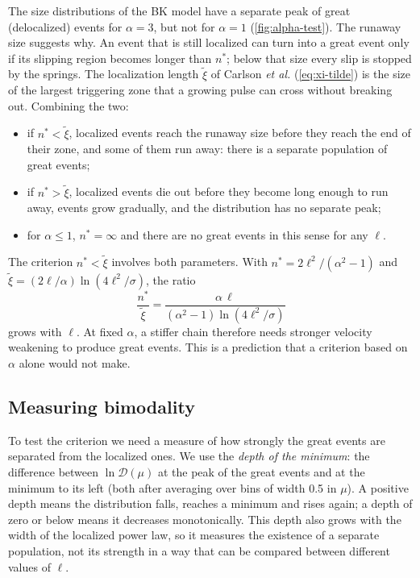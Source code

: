 The size distributions of the BK model have a separate peak of great (delocalized) events for $\alpha = 3$, but not for $\alpha = 1$
(\cref{fig:alpha-test}). The runaway size suggests why. An event that is still localized can turn into a great event only if its slipping region becomes longer than
$n^*$; below that size every slip is stopped by the springs. The localization length $\tilde\xi$ of Carlson \emph{et al.} (\cref{eq:xi-tilde}) is the size of the largest
triggering zone that a growing pulse can cross without breaking out. Combining the two:
\begin{itemize}
  \item if $n^*<\tilde\xi$, localized events reach the runaway size before they reach the end of their zone, and some of them run away: there is a separate population of
    great events;
  \item if $n^*>\tilde\xi$, localized events die out before they become long enough to run away, events grow gradually, and the distribution has no separate peak;
  \item for $\alpha\le1$, $n^* = \infty$ and there are no great events in this sense for any $\ell$.
\end{itemize}
The criterion $n^*<\tilde\xi$ involves both parameters. With $n^* = 2\ell^2/(\alpha^2-1)$ and $\tilde\xi = (2\ell/\alpha)\ln(4\ell^2/\sigma)$, the ratio
\begin{equation}
  \frac{n^*}{\tilde\xi} = \frac{\alpha\,\ell}{(\alpha^2-1)\ln(4\ell^2/\sigma)}
  \label{eq:bimodal}
\end{equation}
grows with $\ell$. At fixed $\alpha$, a stiffer chain therefore needs stronger velocity weakening to produce great events. This is a prediction that a criterion based on
$\alpha$ alone would not make.

\subsection{Measuring bimodality}

To test the criterion we need a measure of how strongly the great events are separated from the localized ones. We use the \emph{depth of the minimum}: the difference
between $\ln\mathcal D(\mu)$ at the peak of the great events and at the minimum to its left (both after averaging over bins of width 0.5 in $\mu$). A positive depth means
the distribution falls, reaches a minimum and rises again; a depth of zero or below means it decreases monotonically. This depth also grows with the width of the
localized power law, so it measures the existence of a separate population, not its strength in a way that can be compared between different values of $\ell$.

